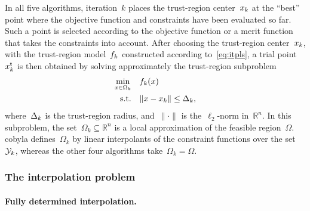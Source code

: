 \documentclass[
    smallextended,  %
    final,          %
]{svjour3}
\newcommand{\R}{\mathbb{R}}
\newcommand{\fsetm}[1][k]{\Omega_{#1}}
\newcommand{\fset}{\Omega}
\newcommand{\iter}[1][k]{x\ifthenelse{\equal{#1}{}}{}{_{#1}}}
\newcommand{\norm}[2][]{#1\lVert#2#1\rVert}
\newcommand{\objm}[1][k]{\obj\ifthenelse{\equal{#1}{}}{}{_{#1}}}
\newcommand{\obj}{f}
\newcommand{\rad}[1][k]{\Delta\ifthenelse{\equal{#1}{}}{}{_{#1}}}
\newcommand{\st}{\text{s.t.}}
\newcommand{\trust}{{\text{t}}}
\newcommand{\xpt}[1][k]{\mathcal{Y}\ifthenelse{\equal{#1}{}}{}{_{#1}}}
\begin{document}
In all five algorithms, iteration~$k$ places the trust-region center~$\iter$ at the ``best'' point where the objective function and constraints have been evaluated so far.
Such a point is selected according to the objective function or a merit function that takes the constraints into account.
After choosing the trust-region center~$\iter$, with the trust-region model~$\objm$ constructed
according to~\eqref{eq:itpls}, a trial point~$\iter^{\trust}$ is then obtained by solving approximately the trust-region subproblem
\begin{equation}
    \label{eq:trsp}
    \begin{split}
        \min_{x \in \fsetm} & \quad \objm(x)\\
        \st                 & \quad \norm{x - \iter} \le \rad,
    \end{split}
\end{equation}
where~$\rad$ is the trust-region radius, and~$\norm{\cdot}$ is the~$\ell_2$-norm in~$\R^n$.
In this subproblem, the set~$\fsetm \subseteq \R^n$ is a local approximation of the feasible region~$\fset$.
\Gls{cobyla} defines~$\fsetm$ by linear interpolants of the constraint functions over the set~$\xpt$,
whereas the other four algorithms take~$\fsetm = \fset$.


\subsubsection{The interpolation problem}
\label{ssec:iptprob}

\paragraph{\textnormal{\textbf{Fully determined interpolation.}}}
\end{document}

